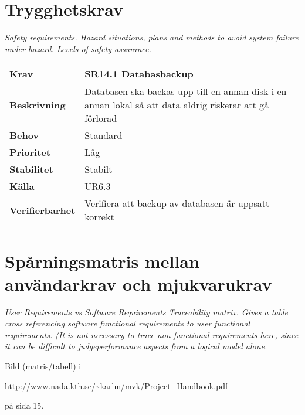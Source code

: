 \documentclass[a4paper, twoside, 11pt, titlepage]{article}
\begin{document}
\clearpage
\section{Trygghetskrav}


\emph{Safety requirements. Hazard situations, plans and methods to avoid system failure under hazard. Levels of safety assurance.}

\begin{tabular} { p{2.6cm} p{12.5cm} }
	\hline
	\sffamily\textbf{Krav} & \sffamily\textbf{SR14.1 Databasbackup } \\
	\hline
	\sffamily\textbf{Beskrivning} & Databasen ska backas upp till en annan disk i en annan lokal så att data aldrig riskerar att gå förlorad  \\
	\hline
	\sffamily\textbf{Behov} & Standard  \\
	\hline
	\sffamily\textbf{Prioritet} & Låg  \\
	\hline
	\sffamily\textbf{Stabilitet} & Stabilt  \\
	\hline
	\sffamily\textbf{Källa} & UR6.3  \\
	\hline
	\sffamily\textbf{Verifierbarhet} & Verifiera att backup av databasen är uppsatt korrekt  \\
	\hline
\end{tabular}


\clearpage
\section{Spårningsmatris mellan användarkrav och mjukvarukrav}


\emph{User Requirements vs Software Requirements Traceability matrix. Gives a table cross referencing software functional requirements to user functional requirements. (It is not necessary to trace non-functional requirements here, since it can be difficult to judgeperformance aspects from a logical model alone.}

Bild (matris/tabell)  i 

\url{http://www.nada.kth.se/~karlm/mvk/Project_Handbook.pdf}

på sida 15.

\clearpage
	\appendix
\end{document}
